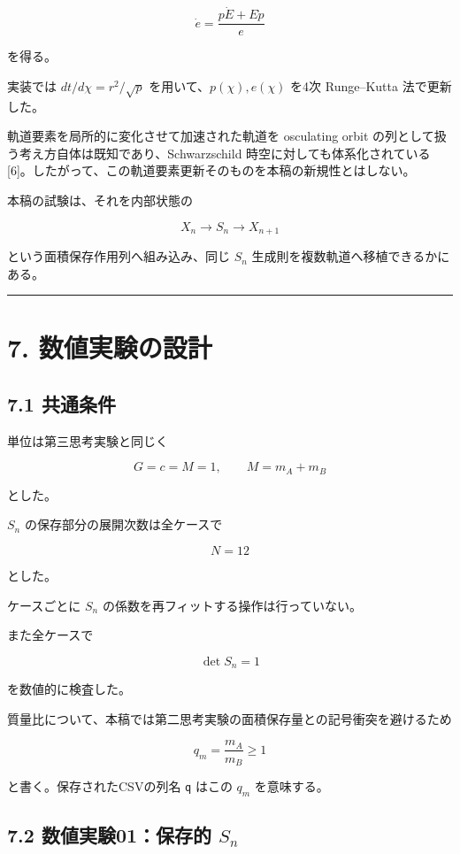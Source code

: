 \documentclass[
  a4paper,
]{ltjsarticle}
\begin{document}
\[
\boxed{
\dot e
=\frac{p\dot E+E\dot p}{e}
}
\]

を得る。

実装では \(dt/d\chi=r^2/\sqrt p\) を用いて、\(p(\chi),e(\chi)\) を4次
Runge--Kutta 法で更新した。

軌道要素を局所的に変化させて加速された軌道を osculating orbit
の列として扱う考え方自体は既知であり、Schwarzschild
時空に対しても体系化されている
{[}6{]}。したがって、この軌道要素更新そのものを本稿の新規性とはしない。

本稿の試験は、それを内部状態の

\[
X_n\rightarrow S_n\rightarrow X_{n+1}
\]

という面積保存作用列へ組み込み、同じ \(S_n\)
生成則を複数軌道へ移植できるかにある。

\begin{center}\rule{0.5\linewidth}{0.5pt}\end{center}

\section{7.
数値実験の設計}\label{ux6570ux5024ux5b9fux9a13ux306eux8a2dux8a08}

\subsection{7.1 共通条件}\label{ux5171ux901aux6761ux4ef6}

単位は第三思考実験と同じく

\[
G=c=M=1,
\qquad
M=m_A+m_B
\]

とした。

\(S_n\) の保存部分の展開次数は全ケースで

\[
N=12
\]

とした。

ケースごとに \(S_n\) の係数を再フィットする操作は行っていない。

また全ケースで

\[
\det S_n=1
\]

を数値的に検査した。

質量比について、本稿では第二思考実験の面積保存量との記号衝突を避けるため

\[
q_m=\frac{m_A}{m_B}\ge1
\]

と書く。保存されたCSVの列名 \texttt{q} はこの \(q_m\) を意味する。

\subsection{\texorpdfstring{7.2 数値実験01：保存的
\(S_n\)}{7.2 数値実験01：保存的 S\_n}}\label{ux6570ux5024ux5b9fux9a1301ux4fddux5b58ux7684-s_n}
\end{document}
